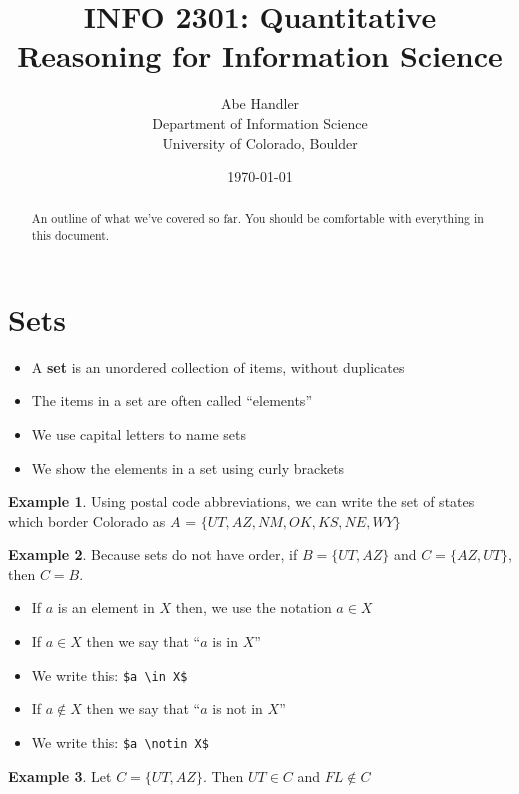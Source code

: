 \documentclass[]{article}
\theoremstyle{definition}
\newtheorem{exmp}{Example}[section]
\begin{document}
\title{INFO 2301: Quantitative Reasoning for Information Science}
\author{Abe Handler \\ Department of Information Science \\ University of Colorado, Boulder}
\date{\today}

\maketitle

\begin{abstract}
An outline of what we've covered so far. You should be comfortable with everything in this document. 
\end{abstract}

\section{Sets}

\begin{itemize}
    \item A \textbf{set} is an unordered collection of items, without duplicates
    \item The items in a set are often called ``elements''
    \item We use capital letters to name sets
    \item We show the elements in a set using curly brackets
\end{itemize}

\begin{exmp}
Using postal code abbreviations, we can write the set of states which border Colorado as  $A$ = $\{UT, AZ, NM, OK, KS, NE, WY\}$
\end{exmp}

\begin{exmp}
Because sets do not have order, if $ B= \{UT, AZ\}$ and $C=\{AZ, UT\}$, then $C=B$.
\end{exmp}

\begin{itemize}
    \item If $a$ is an element in $X$ then, we use the notation $a \in X$ 
    \item If $a \in X$ then we say that ``$a$ is in $X$''
    \item We write this: \verb|$a \in X$|
    \item If $a \notin X$ then we say that ``$a$ is not in $X$''
    \item We write this: \verb|$a \notin X$|
\end{itemize}

\begin{exmp}
Let $ C= \{UT, AZ\}$. Then $UT \in C$ and $FL \notin C$
\end{exmp}
\end{document}
